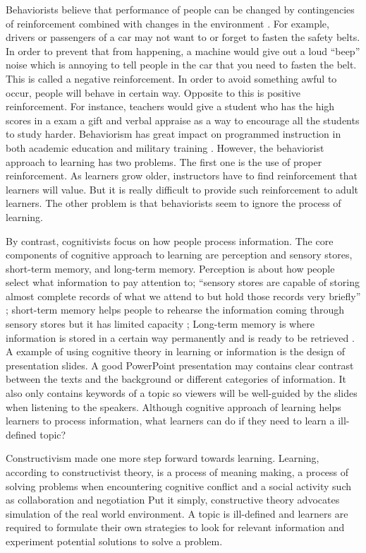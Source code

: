 \documentclass[sigconf]{acmart}
\begin{document}
Behaviorists believe that performance of people can be changed by contingencies of reinforcement combined with changes in the environment \cite{Skinner1954}. For example, drivers or passengers of a car may not want to or forget to fasten the safety belts. In order to prevent that from happening, a machine would give out a loud ``beep'' noise which is annoying to tell people in the car that you need to fasten the belt. This is called a negative reinforcement. In order to avoid something awful to occur, people will behave in certain way. Opposite to this is positive reinforcement. For instance, teachers would give a student who has the high scores in a exam a gift and verbal appraise as a way to encourage all the students to study harder. Behaviorism has great impact on programmed instruction in both academic education and military training \cite{Saettler1990c}. However, the behaviorist approach to learning has two problems. The first one is the use of proper reinforcement. As learners grow older, instructors have to find reinforcement that learners will value. But it is really difficult to provide such reinforcement to adult learners. The other problem is that behaviorists seem to ignore the process of learning.

By contrast, cognitivists focus on how people process information. The core components of cognitive approach to learning are perception and sensory stores, short-term memory, and long-term memory. Perception is about how people select what information to pay attention to; ``sensory stores are capable of storing almost complete records of what we attend to but hold those records very briefly'' ; short-term memory helps people to rehearse the information coming through sensory stores but it has limited capacity ; Long-term memory is where information is stored in a certain way permanently and is ready to be retrieved \cite{Silber2006}.  A example of using cognitive theory in learning or information is the design of presentation slides. A good PowerPoint presentation may contains clear contrast between the texts and the background or different categories of information. It also only contains keywords of a topic so viewers will be well-guided by the slides when listening to the speakers. Although cognitive approach of learning helps learners to process information, what learners can do if they need to learn a ill-defined topic?

Constructivism made one more step forward towards learning.  Learning, according to constructivist theory, is a process of meaning making, a process of solving problems when encountering cognitive conflict and a social activity such as collaboration and negotiation \cite{Wilson2012} Put it simply, constructive theory advocates simulation of the real world environment. A topic is ill-defined and learners are required to formulate their own strategies to look for relevant information and experiment potential solutions to solve a problem.
\end{document}
